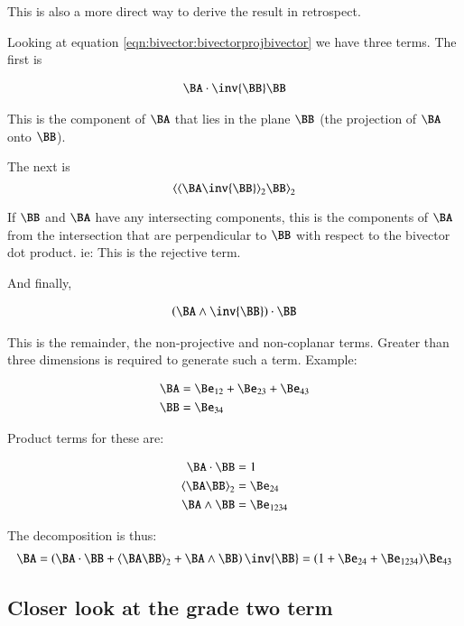 This is also a more direct way to derive the result in retrospect.

Looking at equation \ref{eqn:bivector:bivectorprojbivector} we have three terms.  The first is

\begin{align}
\label{eqn:bivector:foo1}
\BA \cdot \inv{\BB} \BB
\end{align}

This is the component of $\BA$ that lies in the plane $\BB$ (the projection of $\BA$ onto $\BB$).

The next is
\begin{equation}
\label{eqn:bivector:gpgradetwo}
\gpgradetwo{\gpgradetwo{\BA\inv{\BB}} \BB}
\end{equation}

If $\BB$ and $\BA$ have any intersecting components, this is the components of $\BA$ from the intersection that are perpendicular to $\BB$ with respect to the bivector dot product.  ie: This is the rejective term.

And finally,

\begin{align}
\label{eqn:bivector:foo2}
\left(\BA \wedge \inv{\BB}\right) \cdot \BB
\end{align}

This is the remainder, the non-projective and non-coplanar terms.  Greater than three dimensions is required to generate such a term.  Example:

\begin{align*}
\BA &= \Be_{12} + \Be_{23} + \Be_{43} \\
\BB &= \Be_{34} \\
\end{align*}

Product terms for these are:

\begin{align*}
\BA \cdot \BB &= 1 \\
\gpgradetwo{\BA \BB} &= \Be_{24} \\
\BA \wedge \BB &= \Be_{1234} \\
\end{align*}

The decomposition is thus:
\begin{align*}
\BA = \left(\BA \cdot \BB + \gpgradetwo{\BA \BB} + \BA \wedge \BB\right) \inv{\BB} = (1 + \Be_{24} + \Be_{1234}) \Be_{43}
\end{align*}

\subsection{Closer look at the grade two term }

